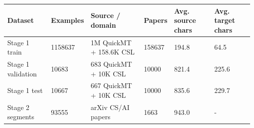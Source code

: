 \begin{tabular}{llllll}
\toprule
Dataset & Examples & Source / domain & Papers & Avg. source chars & Avg. target chars \\
\midrule
Stage 1 train & 1158637 & 1M QuickMT + 158.6K CSL & 158637 & 194.8 & 64.5 \\
Stage 1 validation & 10683 & 683 QuickMT + 10K CSL & 10000 & 821.4 & 225.6 \\
Stage 1 test & 10667 & 667 QuickMT + 10K CSL & 10000 & 835.6 & 229.7 \\
Stage 2 segments & 93555 & arXiv CS/AI papers & 1663 & 943.0 & - \\
\bottomrule
\end{tabular}
